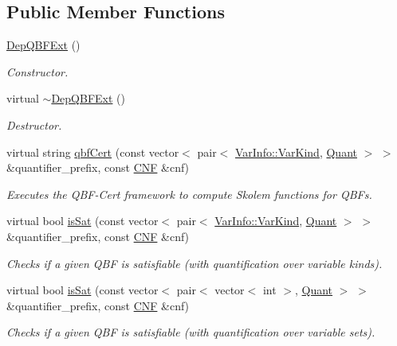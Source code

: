 \subsection*{Public Member Functions}
\begin{DoxyCompactItemize}
\item 
\hyperlink{classDepQBFExt_a4544322ebc125d28e583106baf2c71cb}{Dep\-Q\-B\-F\-Ext} ()
\begin{DoxyCompactList}\small\item\em Constructor. \end{DoxyCompactList}\item 
virtual \hyperlink{classDepQBFExt_a6425c670e11fb6f2315171e27f850954}{$\sim$\-Dep\-Q\-B\-F\-Ext} ()
\begin{DoxyCompactList}\small\item\em Destructor. \end{DoxyCompactList}\item 
virtual string \hyperlink{classDepQBFExt_a18ef56586e1d2d06048cd8aadeeacc74}{qbf\-Cert} (const vector$<$ pair$<$ \hyperlink{classVarInfo_a64d1da76cf84fe674e5fef9764ef11cf}{Var\-Info\-::\-Var\-Kind}, \hyperlink{classQBFSolver_ac091e263cb55286cc07b2451bcf4d3c7}{Quant} $>$ $>$ \&quantifier\-\_\-prefix, const \hyperlink{classCNF}{C\-N\-F} \&cnf)
\begin{DoxyCompactList}\small\item\em Executes the Q\-B\-F-\/\-Cert framework to compute Skolem functions for Q\-B\-Fs. \end{DoxyCompactList}\item 
virtual bool \hyperlink{classExtQBFSolver_abec25b97170b79b42b85d1d4ec825a39}{is\-Sat} (const vector$<$ pair$<$ \hyperlink{classVarInfo_a64d1da76cf84fe674e5fef9764ef11cf}{Var\-Info\-::\-Var\-Kind}, \hyperlink{classQBFSolver_ac091e263cb55286cc07b2451bcf4d3c7}{Quant} $>$ $>$ \&quantifier\-\_\-prefix, const \hyperlink{classCNF}{C\-N\-F} \&cnf)
\begin{DoxyCompactList}\small\item\em Checks if a given Q\-B\-F is satisfiable (with quantification over variable kinds). \end{DoxyCompactList}\item 
virtual bool \hyperlink{classExtQBFSolver_adc1bacec3307200dd90b260789e4c808}{is\-Sat} (const vector$<$ pair$<$ vector$<$ int $>$, \hyperlink{classQBFSolver_ac091e263cb55286cc07b2451bcf4d3c7}{Quant} $>$ $>$ \&quantifier\-\_\-prefix, const \hyperlink{classCNF}{C\-N\-F} \&cnf)
\begin{DoxyCompactList}\small\item\em Checks if a given Q\-B\-F is satisfiable (with quantification over variable sets). \end{DoxyCompactList}\item 

\end{DoxyCompactItemize}
